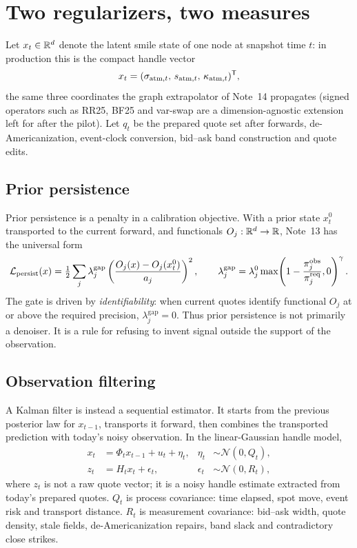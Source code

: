 \documentclass[11pt]{article}
\newcommand{\obs}{\mathrm{obs}}
\newcommand{\gap}{\mathrm{gap}}
\newcommand{\calL}{\mathcal L}
\begin{document}
\section{Two regularizers, two measures}
\label{sec:split}

Let $x_t\in\mathbb{R}^d$ denote the latent smile state of one node at snapshot time
$t$: in production this is the compact handle vector
\[
x_t=(\sigma_{\mathrm{atm},t},\,s_{\mathrm{atm},t},\,\kappa_{\mathrm{atm},t})^{\mathsf{T}},
\]
the same three coordinates the graph extrapolator of Note~14 propagates
(signed operators such as RR25, BF25 and var-swap are a dimension-agnostic
extension left for after the pilot). Let $q_t$ be the prepared quote set after
forwards, de-Americanization, event-clock conversion, bid--ask band
construction and quote edits.

\subsection{Prior persistence}

Prior persistence is a penalty in a calibration objective. With a prior state
$x_t^0$ transported to the current forward, and functionals
$O_j:\mathbb{R}^d\to\mathbb{R}$, Note~13 has the universal form
\begin{equation}
\calL_{\mathrm{persist}}(x)
=\half\sum_j
\lambda_j^{\gap}
\left(\frac{O_j(x)-O_j(x_t^0)}{a_j}\right)^2,
\qquad
\lambda_j^{\gap}
=\lambda_j^0
\max\!\left(1-\frac{\pi^{\obs}_j}{\pi^{\mathrm{req}}_j},0\right)^\gamma .
\label{eq:persistence}
\end{equation}
The gate is driven by \emph{identifiability}: when current quotes identify
functional $O_j$ at or above the required precision, $\lambda_j^{\gap}=0$.
Thus prior persistence is not primarily a denoiser. It is a rule for refusing
to invent signal outside the support of the observation.

\subsection{Observation filtering}

A Kalman filter is instead a sequential estimator. It starts from the previous
posterior law for $x_{t-1}$, transports it forward, then combines the
transported prediction with today's noisy observation. In the linear-Gaussian
handle model,
\begin{align}
x_t &= \Phi_t x_{t-1}+u_t+\eta_t,
&\eta_t&\sim\mathcal N(0,Q_t), \label{eq:state}\\
z_t &= H_t x_t+\epsilon_t,
&\epsilon_t&\sim\mathcal N(0,R_t), \label{eq:measurement}
\end{align}
where $z_t$ is not a raw quote vector; it is a noisy handle estimate extracted
from today's prepared quotes. $Q_t$ is process covariance: time elapsed, spot
move, event risk and transport distance. $R_t$ is measurement covariance:
bid--ask width, quote density, stale fields, de-Americanization repairs, band
slack and contradictory close strikes.
\end{document}
